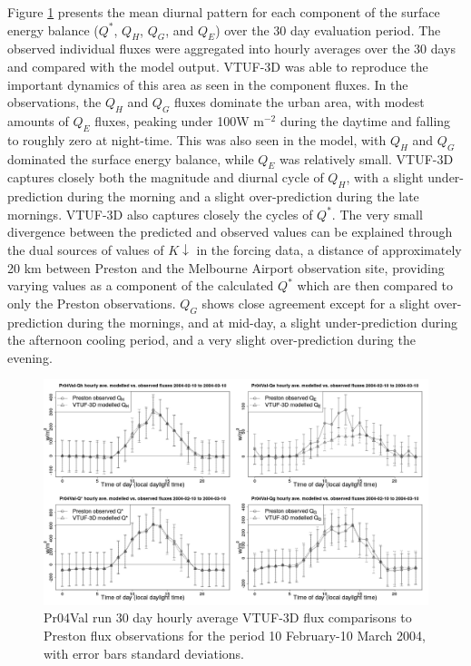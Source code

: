 \documentclass[final,3p,times,authoryear]{elsarticle}
\begin{document}
Figure \ref{fig:Preston30Day4} presents the mean diurnal pattern for each component of the surface energy balance ($Q^{*}$, $Q_{H}$, $Q_{G}$, and $Q_{E}$)  over the 30 day evaluation period. The observed individual fluxes were aggregated into hourly averages over the 30 days and compared with the model output. VTUF-3D was able to reproduce the important dynamics of this area as seen in the component fluxes. In the observations, the $Q_{H}$ and $Q_{G}$ fluxes dominate the urban area, with modest amounts of $Q_{E}$ fluxes, peaking under 100W m$^{-2}$ during the daytime and falling to roughly zero at night-time. This was also seen in the model, with $Q_{H}$ and $Q_{G}$ dominated the surface energy balance, while $Q_{E}$ was relatively small. VTUF-3D captures closely both the magnitude and diurnal cycle of $Q_{H}$, with a slight under-prediction during the morning and a slight over-prediction during the late mornings. VTUF-3D also captures closely the cycles of $Q^{*}$. The very small divergence between the predicted and observed values can be explained through the dual sources of values of $K\downarrow$ in the forcing data, a distance of approximately 20 km between Preston and the Melbourne Airport observation site, providing varying values as a component of the calculated $Q^{*}$ which are then compared to only the Preston observations. $Q_{G}$ shows close agreement except for a slight over-prediction during the mornings, and at mid-day, a slight under-prediction during the afternoon cooling period, and a very slight over-prediction during the evening. 



\begin{figure}[!htbp] 
\includegraphics[trim = 0mm 0mm 0mm 0mm, clip, scale=0.30]{images/Pr04Val-EnergyBalanceOverallAve4Plots_.png}
\caption{Pr04Val run 30 day hourly average VTUF-3D flux comparisons to Preston flux observations for the period 10 February-10 March 2004, with error bars standard deviations. \label{fig:Preston30Day4} }     
\end{figure}
\end{document}
